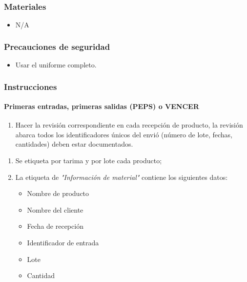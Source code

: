 \subsubsection{Materiales}

\begin{itemize}
	\item N/A
\end{itemize}

\subsubsection{Precauciones de seguridad}

\begin{itemize}
	\item Usar el uniforme completo.
\end{itemize}

\subsubsection{Instrucciones}

\paragraph{Primeras entradas, primeras salidas (PEPS) o VENCER}

\begin{enumerate}
	\item Hacer la revisión correspondiente en cada recepción de producto, la revisión abarca todos los identificadores únicos del envió (número de lote, fechas, cantidades) deben estar documentados.
\end{enumerate}


\begin{enumerate}
	\item Se etiqueta por tarima y por lote cada producto;
	\item La etiqueta de \emph{"Información de material"} contiene los siguientes datos:
	\begin{itemize}
		\item Nombre de producto
		\item Nombre del cliente
		\item Fecha de recepción
		\item Identificador de entrada
		\item Lote
		\item Cantidad
	\end{itemize}
\end{enumerate}

